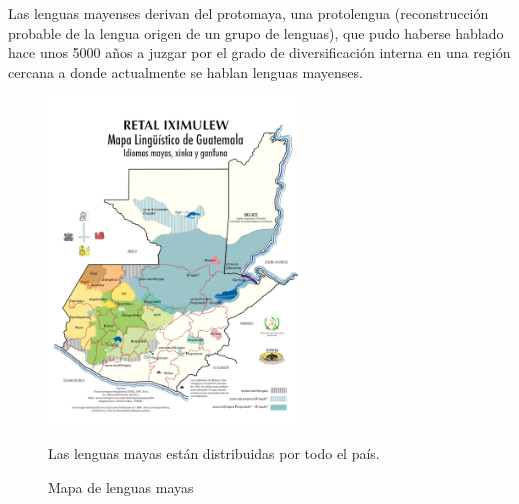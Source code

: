 \documentclass[a4paper,openright,11pt]{article}
\begin{document}
Las lenguas mayenses derivan del protomaya, una protolengua (reconstrucción probable de la lengua origen de un grupo de lenguas), que pudo haberse hablado hace unos 5000 años a juzgar por el grado de diversificación interna en una región cercana a donde actualmente se hablan lenguas mayenses.

\begin{figure}[H]
	\centering
	\includegraphics[width=0.6\textwidth]{mapa}
	\caption{Mapa de lenguas mayas}
	Las lenguas mayas están distribuidas por todo el país.
	\label{fig:map}
\end{figure}
\end{document}
